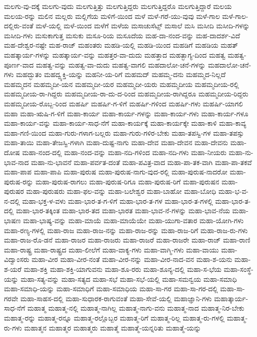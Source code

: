 {ಮಲಗು-ವು-ದಕ್ಕೆ
ಮಲಗು-ವುದು
ಮಲಗುತ್ತಿತ್ತು
ಮಲಗುತ್ತಿದ್ದರು
ಮಲಗುತ್ತಿದ್ದರೊ
ಮಲಗುತ್ತಿದ್ದಾರೆ
ಮಲಯ
ಮಲಯ-ರನ್ನು
ಮಲಿನ
ಮಲ್ಲರು
ಮಲ್ಲಿಗೆಯ
ಮಳಿಗೆ-ಯಿಂದ
ಮಳೆ
ಮಳೆ-ಗರೆ-ಯು-ವುವು
ಮಳೆ-ಗಾಲ
ಮಳೆ-ಗಾಲ-ದಲ್ಲಿರು-ವಂತೆ
ಮಳೆ-ಯಲ್ಲಿ
ಮಳೆ-ಯಿಂದ
ಮಳೆಗೆ
ಮಳೆಯ
ಮಸಾಚುಸೆಟ್ಸ್
ಮಸಾಲೆ
ಮಸಿ
ಮಸೀದಿ
ಮಸೀದಿ-ಗಳನ್ನು
ಮಸೀದಿ-ಗಳು
ಮಸುಕಾಗುತ್ತ
ಮಸುಕು
ಮಸೂ-ರಿಯ
ಮಸೂದೆಯ
ಮಹ-ದಾ-ನಂದ-ವನ್ನು
ಮಹ-ದಾದರ್ಶ-ವಿದೆ
ಮಹ-ದೇಶ್ವರ-ನಷ್ಟೇ
ಮಹ-ರಾಜ್
ಮಹಂತರು
ಮಹಡಿ-ಯಲ್ಲಿ
ಮಹಡಿ-ಯಿಂದ
ಮಹಡಿಗೆ
ಮಹಡಿಯ
ಮಹತ್
ಮಹತ್ಕಾರ್ಯ-ಗಳನ್ನು
ಮಹತ್ಕಾರ್ಯ-ವನ್ನು
ಮಹತ್ತರ-ವಾ-ದುದು
ಮಹತ್ತಾದ
ಮಹತ್ಭಾಗ್ಯ-ದಿಂದ
ಮಹತ್ವ
ಮಹತ್ವ-ಪೂರ್ಣ-ವಾದ
ಮಹತ್ವ-ವನ್ನು
ಮಹತ್ವ-ವಾ-ದುದು
ಮಹತ್ವ-ವಾಗಲಿ
ಮಹದಾಲೋ-ಚನೆ-ಗಳನ್ನು
ಮಹದಾಲೋ-ಚನೆ-ಗಳು
ಮಹದ್ಭುತಂ
ಮಹದ್ವ್ಯಕ್ತಿ-ಯನ್ನು
ಮಹನೀ-ಯ-ರಿಗೆ
ಮಹಮದ್
ಮಹಮ್ಮ-ದನು
ಮಹಮ್ಮದ-ನಿಲ್ಲದೆ
ಮಹಮ್ಮದನ
ಮಹಮ್ಮದೀ-ಯನ
ಮಹಮ್ಮದೀ-ಯರ
ಮಹಮ್ಮದೀ-ಯರು
ಮಹಮ್ಮದೀಯ
ಮಹಮ್ಮದೀಯ-ರಲ್ಲಿ
ಮಹಮ್ಮದೀಯ-ರಾ-ಗಿದ್ದರು
ಮಹಮ್ಮದೀಯ-ರಾ-ದು-ದ-ರಿಂದ
ಮಹಮ್ಮದೀಯ-ರಾಗಿದ್ದರೂ
ಮಹಮ್ಮದೀಯ-ರಿದ್ದರು
ಮಹಮ್ಮದೀಯ-ರೊಬ್ಬ-ರಿಂದ
ಮಹರ್ಷಿ
ಮಹರ್ಷಿ-ಗ-ಳಿಗೆ
ಮಹರ್ಷಿ-ಗಳಿಂದ
ಮಹರ್ಷಿ-ಗಳು
ಮಹರ್ಷಿ-ಯಾಗಲಿ
ಮಹಾ
ಮಹಾ-ಋಷಿ-ಗ-ಳಿಗೆ
ಮಹಾ-ಕಾರ್ಯ
ಮಹಾ-ಕಾರ್ಯ-ಗಳನ್ನು
ಮಹಾ-ಕಾರ್ಯ-ಗಳು
ಮಹಾ-ಕಾರ್ಯ-ಗಳೂ
ಮಹಾ-ಕಾರ್ಯ-ವನ್ನು
ಮಹಾ-ಕಾರ್ಯ-ಸಾಧ-ನೆಗೆ
ಮಹಾ-ಕಾರ್ಯಕ್ಕೆ
ಮಹಾ-ಕಾರ್ಯಕ್ಕೇ
ಮಹಾ-ಕಾಳಿ
ಮಹಾ-ಕಾವ್ಯ
ಮಹಾ-ಗಣಿ-ಯಿಂದ
ಮಹಾ-ಗುರು-ಗಳಾಗ-ಬಲ್ಲರು
ಮಹಾ-ಗುರು-ಗಳಿರ-ಬೇಕು
ಮಹಾ-ತಪಸ್ವಿ-ಗಳ
ಮಹಾ-ತಪಸ್ಸು
ಮಹಾ-ತಾಯಿ
ಮಹಾ-ತೇಜಸ್ವಿ-ಗಳಾಗಿ
ಮಹಾ-ದುಷ್ಟ-ನಾಗು
ಮಹಾ-ದೇವ
ಮಹಾ-ದೇವನ
ಮಹಾ-ದೇವನು
ಮಹಾ-ದೋಷ
ಮಹಾ-ನಂದ-ದಲ್ಲಿ
ಮಹಾ-ನಂದ-ವನ್ನು
ಮಹಾ-ನದಿ-ಗಳಿಂದ
ಮಹಾ-ನದಿ-ಗಳು
ಮಹಾ-ನೀಯರು
ಮಹಾ-ನು-ಭಾವ-ನಾದ
ಮಹಾ-ನು-ಭಾವನೆ
ಮಹಾ-ಪರ್ವತ-ದಂತೆ
ಮಹಾ-ಪವಿತ್ರ-ವಾದ
ಮಹಾ-ಪಾ-ತಕ-ವಾಗಿ
ಮಹಾ-ಪಾ-ತಕವೆ
ಮಹಾ-ಪಾಪ
ಮಹಾ-ಪಾಪಿ
ಮಹಾ-ಪುರುಷ
ಮಹಾ-ಪುರುಷ-ನಾಗು-ವುದ-ರಲ್ಲಿ
ಮಹಾ-ಪುರುಷ-ನಾದರೋ
ಮಹಾ-ಪುರುಷ-ರನ್ನು
ಮಹಾ-ಪುರುಷ-ರಾಗಲು
ಮಹಾ-ಪುರುಷ-ರಿಗೂ
ಮಹಾ-ಪುರುಷ-ರಿಗೆ
ಮಹಾ-ಪುರುಷನ
ಮಹಾ-ಪುರುಷರ
ಮಹಾ-ಪುರುಷರು
ಮಹಾ-ಫಲ-ವನ್ನು
ಮಹಾ-ಬಲೇಶ್ವರ
ಮಹಾ-ಬಾಹೋ
ಮಹಾ-ಬೋಧಿ
ಮಹಾ-ಭ-ವ-ನ-ದಲ್ಲಿ
ಮಹಾ-ಭಕ್ತ-ಳ-ವಳು
ಮಹಾ-ಭಾರ-ತ-ಗ-ಳಿಗೆ
ಮಹಾ-ಭಾರ-ತ-ಗಳ
ಮಹಾ-ಭಾರ-ತ-ಗಳಲ್ಲಿ
ಮಹಾ-ಭಾರ-ತ-ದಲ್ಲಿ
ಮಹಾ-ಭಾರ-ತಕ್ಕಿಂತ
ಮಹಾ-ಭಾರ-ತದ
ಮಹಾ-ಭಾರತ
ಮಹಾ-ಭಾವ-ನೆ-ಗಳನ್ನು
ಮಹಾ-ಭಾವ-ನೆಯ
ಮಹಾ-ಭಾಷಣ
ಮಹಾ-ಭಾಷ್ಯ-ವನ್ನು
ಮಹಾ-ಮಾಯೆ
ಮಹಾ-ಮಾಯೆಯೇ
ಮಹಾ-ಯುಗಾ-ವತಾರ
ಮಹಾ-ಯೋಗಿ-ಗಳು
ಮಹಾ-ರಣ್ಯ-ಗಳಲ್ಲಿ
ಮಹಾ-ರಾಜ
ಮಹಾ-ರಾಜ-ನನ್ನು
ಮಹಾ-ರಾಜ-ರನ್ನು
ಮಹಾ-ರಾಜ-ರಿಗೆ
ಮಹಾ-ರಾಜ-ರು-ಗಳು
ಮಹಾ-ರಾಜ-ರೊ-ಡನೆ
ಮಹಾ-ರಾಜರ
ಮಹಾ-ರಾಜರು
ಮಹಾ-ರಾಜರೆ
ಮಹಾ-ರಾಜರೇ
ಮಹಾ-ರಾಜ್
ಮಹಾ-ರಾಣಿ
ಮಹಾ-ರಾಷ್ಟ್ರ
ಮಹಾ-ರಾಷ್ಟ್ರದ
ಮಹಾ-ಲೀಲೆಗೆ
ಮಹಾ-ವಾಕ್ಯ-ಗಳು
ಮಹಾ-ವಾಗ್ಮಿ-ಗಳು
ಮಹಾ-ವಾಯು
ಮಹಾ-ವಿದ್ವಾಂಸರು
ಮಹಾ-ವೀರ
ಮಹಾ-ವೀರ-ನಂತೆ
ಮಹಾ-ವೀರ-ನನ್ನು
ಮಹಾ-ವೀರ-ನಾದ-ವನ
ಮಹಾ-ಶ-ಯನು
ಮಹಾ-ಶ-ಯರೆ
ಮಹಾ-ಶಕ್ತಿ
ಮಹಾ-ಶಕ್ತಿ-ಯಾಗುವನು
ಮಹಾ-ಶೂ-ರರು
ಮಹಾ-ಶೂನ್ಯ-ದಲ್ಲಿ
ಮಹಾ-ಸ-ಭೆಯ
ಮಹಾ-ಸಂಸ್ಥೆ-ಯನ್ನು
ಮಹಾ-ಸತ್ಯ-ವನ್ನು
ಮಹಾ-ಸತ್ಯದ
ಮಹಾ-ಸಭೆ
ಮಹಾ-ಸಭೆ-ಯಲ್ಲಿ
ಮಹಾ-ಸಮನ್ವಯ
ಮಹಾ-ಸಮಾಧಿ
ಮಹಾ-ಸಮಾಧಿ-ಯನ್ನು
ಮಹಾ-ಸಮಾಧಿಗೆ
ಮಹಾ-ಸಮಾಧಿಯ
ಮಹಾ-ಸಾ-ಗರ
ಮಹಾ-ಸಾ-ಗರ-ದಲ್ಲಿ
ಮಹಾ-ಸಾ-ಗರವೇ
ಮಹಾ-ಸಾಹಸ-ದಲ್ಲಿ
ಮಹಾ-ಸುಧಾರಕ-ರಾಗುವಂತೆ
ಮಹಾ-ಸೇವೆ-ಯಲ್ಲಿ
ಮಹಾಜ್ಞಾನಿ-ಗಳು
ಮಹಾತ್ಕಾರ್ಯ-ಸಾಧ-ನೆಗೆ
ಮಹಾತ್ಮ
ಮಹಾತ್ಮ-ನಲ್ಲಿ
ಮಹಾತ್ಮ-ನಾಗಿಲ್ಲ
ಮಹಾತ್ಮ-ನಾಗು-ವನು
ಮಹಾತ್ಮ-ನಾದ
ಮಹಾತ್ಮ-ನಿರ-ಬೇಕು
ಮಹಾತ್ಮ-ರನ್ನು
ಮಹಾತ್ಮ-ರನ್ನೂ
ಮಹಾತ್ಮ-ರಲ್ಲೊಬ್ಬರ
ಮಹಾತ್ಮ-ರಿಗೆ
ಮಹಾತ್ಮ-ರಿಲ್ಲ
ಮಹಾತ್ಮ-ರು-ಗಳಲ್ಲಿ
ಮಹಾತ್ಮ-ರು-ಗಳು
ಮಹಾತ್ಮನ
ಮಹಾತ್ಮರ
ಮಹಾತ್ಮರು
ಮಹಾತ್ಮೆ
ಮಹಾತ್ಮೆ-ಯನ್ನರಿತು
ಮಹಾತ್ಮೆ-ಯನ್ನು
}
